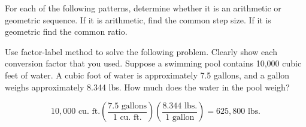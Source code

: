 \documentclass[11pt,answers]{exam}
\begin{document}
\begin{questions}

\question For each of the following patterns, determine whether it is an arithmetic or geometric sequence. If it is arithmetic, find the common step size.  If it is geometric find the common ratio. 

\question Use factor-label method to solve the following problem.  Clearly show each conversion factor that you used. 
Suppose a swimming pool contains 10,000 cubic feet of water.  A cubic foot of water is approximately 7.5 gallons, and a gallon weighs approximately 8.344 lbs. How much does the water in the pool weigh?  
\begin{solution}
$$10{,}000 \text{ cu. ft.} \left( \frac{7.5 \text{ gallons}}{1 \text{ cu. ft.}} \right) \left( \frac{8.344 \text{ lbs.}}{1 \text{ gallon}} \right)  = 625{,}800 \text{ lbs.}$$
\end{solution}
\vfill
\vfill



\end{questions}
\end{document}
